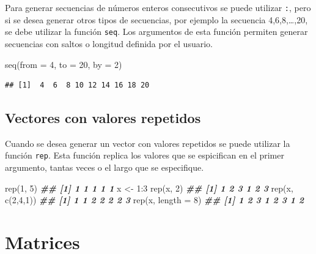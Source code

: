 \documentclass[
]{book}
\newenvironment{Shaded}{\begin{snugshade}}{\end{snugshade}}
\newcommand{\AttributeTok}[1]{\textcolor[rgb]{0.77,0.63,0.00}{#1}}
\newcommand{\DecValTok}[1]{\textcolor[rgb]{0.00,0.00,0.81}{#1}}
\newcommand{\DocumentationTok}[1]{\textcolor[rgb]{0.56,0.35,0.01}{\textbf{\textit{#1}}}}
\newcommand{\FunctionTok}[1]{\textcolor[rgb]{0.00,0.00,0.00}{#1}}
\newcommand{\NormalTok}[1]{#1}
\newcommand{\OtherTok}[1]{\textcolor[rgb]{0.56,0.35,0.01}{#1}}
\newcommand{\SpecialCharTok}[1]{\textcolor[rgb]{0.00,0.00,0.00}{#1}}
\begin{document}
Para generar secuencias de números enteros consecutivos se puede utilizar \texttt{:}, pero si se desea generar otros tipos de secuencias, por ejemplo la secuencia 4,6,8,\ldots,20, se debe utilizar la función \texttt{seq}. Los argumentos de esta función permiten generar secuencias con saltos o longitud definida por el usuario.

\begin{Shaded}
\begin{Highlighting}[]
\FunctionTok{seq}\NormalTok{(}\AttributeTok{from =} \DecValTok{4}\NormalTok{, }\AttributeTok{to =} \DecValTok{20}\NormalTok{, }\AttributeTok{by =} \DecValTok{2}\NormalTok{)}
\end{Highlighting}
\end{Shaded}

\begin{verbatim}
## [1]  4  6  8 10 12 14 16 18 20
\end{verbatim}

\hypertarget{vectores-con-valores-repetidos}{%
\subsection{Vectores con valores repetidos}\label{vectores-con-valores-repetidos}}

Cuando se desea generar un vector con valores repetidos se puede utilizar la función \texttt{rep}. Esta función replica los valores que se espicifican en el primer argumento, tantas veces o el largo que se especifique.

\begin{Shaded}
\begin{Highlighting}[]
\FunctionTok{rep}\NormalTok{(}\DecValTok{1}\NormalTok{, }\DecValTok{5}\NormalTok{)}
\DocumentationTok{\#\# [1] 1 1 1 1 1}
\NormalTok{x }\OtherTok{\textless{}{-}} \DecValTok{1}\SpecialCharTok{:}\DecValTok{3}
\FunctionTok{rep}\NormalTok{(x, }\DecValTok{2}\NormalTok{)}
\DocumentationTok{\#\# [1] 1 2 3 1 2 3}
\FunctionTok{rep}\NormalTok{(x, }\FunctionTok{c}\NormalTok{(}\DecValTok{2}\NormalTok{,}\DecValTok{4}\NormalTok{,}\DecValTok{1}\NormalTok{))}
\DocumentationTok{\#\# [1] 1 1 2 2 2 2 3}
\FunctionTok{rep}\NormalTok{(x, }\AttributeTok{length =} \DecValTok{8}\NormalTok{)}
\DocumentationTok{\#\# [1] 1 2 3 1 2 3 1 2}
\end{Highlighting}
\end{Shaded}

\hypertarget{matrices}{%
\section{Matrices}\label{matrices}}
\end{document}
